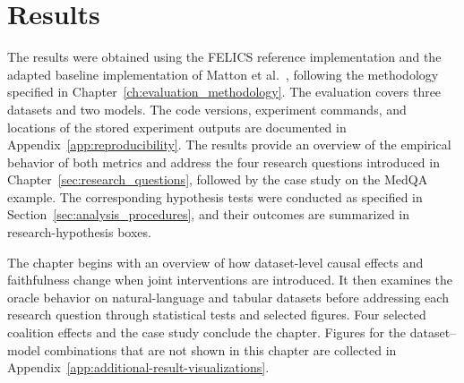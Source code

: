 \chapter{Results}
\label{sec:results}





The results were obtained using the FELICS reference implementation and the adapted baseline implementation of Matton et al.~\cite{mattonWalkTalkMeasuring2024}, following the methodology specified in Chapter~\ref{ch:evaluation_methodology}. The evaluation covers three datasets and two models. The code versions, experiment commands, and locations of the stored experiment outputs are documented in Appendix~\ref{app:reproducibility}. The results provide an overview of the empirical behavior of both metrics and address the four research questions introduced in Chapter~\ref{sec:research_questions}, followed by the case study on the MedQA example. The corresponding hypothesis tests were conducted as specified in Section~\ref{sec:analysis_procedures}, and their outcomes are summarized in research-hypothesis boxes.

The chapter begins with an overview of how dataset-level causal effects and faithfulness change when joint interventions are introduced. It then examines the oracle behavior on natural-language and tabular datasets before addressing each research question through statistical tests and selected figures. Four selected coalition effects and the case study conclude the chapter. Figures for the dataset--model combinations that are not shown in this chapter are collected in Appendix~\ref{app:additional-result-visualizations}.

\FloatBarrier

\FloatBarrier

\FloatBarrier

\FloatBarrier

\FloatBarrier


\FloatBarrier

\FloatBarrier
